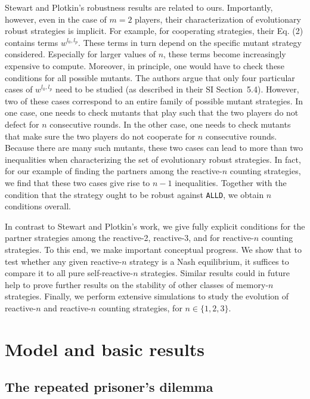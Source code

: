 \documentclass[9pt,twoside,lineno]{pnas-new}
\theoremstyle{plainCl1}
\theoremstyle{plainCl2}
\def\alld{\texttt{ALLD}}
\begin{document}
Stewart and Plotkin's robustness results are related to ours. 
Importantly,  however, even in the case of $m\!=\!2$ players, their characterization of evolutionary robust strategies is implicit.  
For example, for cooperating strategies, their Eq. (2) contains terms $w^{l_0,l_p}$. 
These terms in turn depend on the specific mutant strategy considered. 
Especially for larger values of $n$, these terms become increasingly expensive to compute. 
Moreover, in principle, one would have to check these conditions for all possible mutants. 
The authors argue that only four particular cases of  $w^{l_0,l_p}$ need to be studied (as described in their SI Section~5.4).
However, two of these cases correspond to an entire family of possible mutant strategies. 
In one case, one needs to check mutants that play such that the two players do not defect for $n$ consecutive rounds.  
In the other case, one needs to check mutants that make sure the two players do not cooperate for $n$ consecutive rounds. 
Because there are many such mutants, these two cases can lead to more than two inequalities when characterizing the set of evolutionary robust strategies. 
In fact, for our example of finding the partners among the reactive-$n$ counting strategies, we find that these two cases give rise to $n\!-\!1$ inequalities. 
Together with the condition that the strategy ought to be robust against \alld, we obtain $n$ conditions overall. 

In contrast to Stewart and Plotkin's work, we give fully explicit conditions for the partner strategies among the reactive-2, reactive-3, and for reactive-$n$ counting strategies. 
To this end, we make important conceptual progress. 
We show that to test whether any given reactive-$n$ strategy is a Nash equilibrium, it suffices to compare it to all pure self-reactive-$n$ strategies. 
Similar results could in future help to prove further results on the stability of other classes of memory-$n$ strategies.  
Finally, we perform extensive simulations to study the evolution of reactive-$n$ and reactive-$n$ counting strategies, for $n\!\in\!\{1,2,3\}$. 





\section{Model and basic results}\label{section:model}

\subsection{The repeated prisoner's dilemma}
\end{document}
